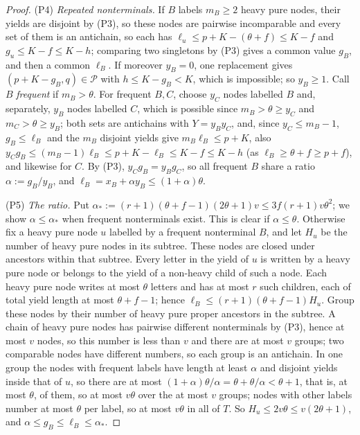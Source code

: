 \documentclass[11pt]{article}
\numberwithin{equation}{section}
\theoremstyle{plain}
\theoremstyle{definition}
\theoremstyle{remark}
\theoremstyle{plain}
\begin{document}
\begin{proof}
(P4) \emph{Repeated nonterminals.}  If $B$ labels $m_B\ge2$ heavy pure nodes,
their yields are disjoint by (P3), so these nodes are pairwise incomparable and
every set of them is an antichain, so each has $\ell_u\le p+K-(\theta+f)\le K-f$ and
$g_u\le K-f\le K-h$; comparing two singletons by (P3) gives a common value $g_B$,
and then a common $\ell_B$.  If moreover $y_B=0$, one replacement gives
$(p+K-g_B,q)\in\mathcal P$ with $h\le K-g_B<K$, which is impossible; so $y_B\ge1$.
Call $B$ \emph{frequent} if $m_B>\theta$.  For frequent $B,C$, choose $y_C$ nodes
labelled $B$ and, separately, $y_B$ nodes labelled $C$, which is possible since
$m_B>\theta\ge y_C$ and $m_C>\theta\ge y_B$; both sets are antichains with
$Y=y_By_C$, and, since $y_C\le m_B-1$, $g_B\le\ell_B$ and the $m_B$ disjoint
yields give $m_B\ell_B\le p+K$, also $y_Cg_B\le(m_B-1)\ell_B\le p+K-\ell_B\le
K-f\le K-h$ (as $\ell_B\ge\theta+f\ge p+f$), and likewise for $C$.  By (P3), $y_Cg_B=y_Bg_C$, so all frequent $B$ share a ratio
$\alpha:=g_B/y_B$, and $\ell_B=x_B+\alpha y_B\le(1+\alpha)\theta$.

(P5) \emph{The ratio.}  Put $\alpha_*:=(r+1)(\theta+f-1)(2\theta+1)v\le3f(r+1)v\theta^2$;
we show $\alpha\le\alpha_*$ when frequent nonterminals exist.  This is clear if
$\alpha\le\theta$.  Otherwise fix a heavy pure node $u$ labelled by a frequent
nonterminal $B$, and let $H_u$ be the number of heavy pure nodes in its subtree.
These nodes are closed under ancestors within that subtree.  Every letter in the
yield of $u$ is written by a heavy pure node or belongs to the yield of a
non-heavy child of such a node.  Each heavy pure node writes at most $\theta$
letters and has at most $r$ such children, each of total yield length at most
$\theta+f-1$; hence $\ell_B\le(r+1)(\theta+f-1)H_u$.  Group these nodes by their
number of heavy pure proper ancestors in the subtree.  A chain of heavy pure
nodes has pairwise different nonterminals by (P3), hence at most $v$ nodes, so
this number is less than $v$ and there are at most $v$ groups; two comparable
nodes have different numbers, so each group is an antichain.  In one group the nodes with frequent labels have
length at least $\alpha$ and disjoint yields inside that of $u$, so there are at
most $(1+\alpha)\theta/\alpha=\theta+\theta/\alpha<\theta+1$, that is, at most
$\theta$, of them, so at most $v\theta$ over the at most $v$ groups; nodes with
other labels number at most $\theta$ per label, so at most $v\theta$ in all of
$T$.  So $H_u\le2v\theta\le v(2\theta+1)$, and
$\alpha\le g_B\le\ell_B\le\alpha_*$.


\end{proof}
\end{document}
